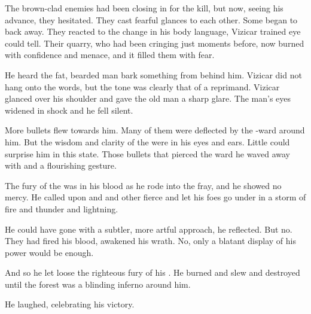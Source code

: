 The brown-clad enemies had been closing in for the kill, but now, seeing his advance, they hesitated. 
They cast fearful glances to each other. 
Some began to back away. 
They reacted to the change in his body language, Vizicar trained eye could tell. 
Their quarry, who had been cringing just moments before, now burned with confidence and menace, and it filled them with fear. 


He heard the fat, bearded man bark something from behind him. 
Vizicar did not hang onto the words, but the tone was clearly that of a reprimand. 
Vizicar glanced over his shoulder and gave the old man a sharp glare. 
The man's eyes widened in shock and he fell silent. 


More bullets flew towards him. 
Many of them were deflected by the \Hoshied-ward around him.
But the wisdom and clarity of the \sephiroth{} were in his eyes and ears. 
Little could surprise him in this state. 
Those bullets that pierced the ward he waved away with \Atzirah{} and a flourishing gesture. 

The fury of the \qliphoth{} was in his blood as he rode into the fray, and he showed no mercy. 
He called upon \Izion{} and  and other fierce \Archons{} and let his foes go under in a storm of fire and thunder and lightning. 

He could have gone with a subtler, more artful approach, he reflected. 
But no. 
They had fired his blood, awakened his wrath. 
No, only a blatant display of his power would be enough. 


And so he let loose the righteous fury of his \sephiroth. 
He burned and slew and destroyed until the forest was a blinding inferno around him. 

He laughed, celebrating his victory. 


